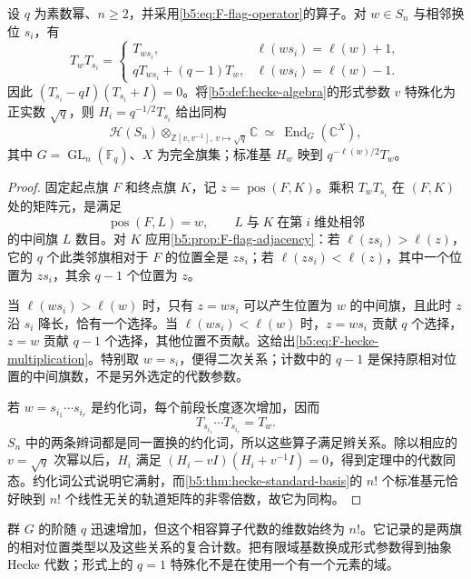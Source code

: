 \begin{theorem}\label{b5:thm:F-flag-hecke}
	设 \(q\) 为素数幂、\(n\ge2\)，并采用\eqref{b5:eq:F-flag-operator}的算子。对 \(w\in S_n\) 与相邻换位 \(s_i\)，有
	\begin{equation}\label{b5:eq:F-hecke-multiplication}
		T_wT_{s_i}=
		\begin{cases}
			T_{ws_i},&\ell(ws_i)=\ell(w)+1,\\
			qT_{ws_i}+(q-1)T_w,&\ell(ws_i)=\ell(w)-1.
		\end{cases}
	\end{equation}
	因此 \((T_{s_i}-qI)(T_{s_i}+I)=0\)。将\cref{b5:def:hecke-algebra}的形式参数 \(v\) 特殊化为正实数 \(\sqrt q\)，则 \(H_i=q^{-1/2}T_{s_i}\) 给出同构
	\[
		\mathcal H(S_n)\otimes_{\mathbb Z[v,v^{-1}],\,v\mapsto\sqrt q}\mathbb C
		\ \simeq\ \operatorname{End}_G(\mathbb C^X),
	\]
	其中 \(G=\operatorname{GL}_n(\mathbb F_q)\)、\(X\) 为完全旗集；标准基 \(H_w\) 映到 \(q^{-\ell(w)/2}T_w\)。
\end{theorem}
\begin{proof}
	固定起点旗 \(F\) 和终点旗 \(K\)，记 \(z=\operatorname{pos}(F,K)\)。乘积 \(T_wT_{s_i}\) 在 \((F,K)\) 处的矩阵元，是满足
	\[
		\operatorname{pos}(F,L)=w,\qquad L\;\text{与}\;K\;\text{在第}\;i\;\text{维处相邻}
	\]
	的中间旗 \(L\) 数目。对 \(K\) 应用\cref{b5:prop:F-flag-adjacency}：若 \(\ell(zs_i)>\ell(z)\)，它的 \(q\) 个此类邻旗相对于 \(F\) 的位置全是 \(zs_i\)；若 \(\ell(zs_i)<\ell(z)\)，其中一个位置为 \(zs_i\)，其余 \(q-1\) 个位置为 \(z\)。

	当 \(\ell(ws_i)>\ell(w)\) 时，只有 \(z=ws_i\) 可以产生位置为 \(w\) 的中间旗，且此时 \(z\) 沿 \(s_i\) 降长，恰有一个选择。当 \(\ell(ws_i)<\ell(w)\) 时，\(z=ws_i\) 贡献 \(q\) 个选择，\(z=w\) 贡献 \(q-1\) 个选择，其他位置不贡献。这给出\eqref{b5:eq:F-hecke-multiplication}。特别取 \(w=s_i\)，便得二次关系；计数中的 \(q-1\) 是保持原相对位置的中间旗数，不是另外选定的代数参数。

	若 \(w=s_{i_1}\cdots s_{i_r}\) 是约化词，每个前段长度逐次增加，因而
	\[
		T_{s_{i_1}}\cdots T_{s_{i_r}}=T_w.
	\]
	\(S_n\) 中的两条辫词都是同一置换的约化词，所以这些算子满足辫关系。除以相应的 \(v=\sqrt q\) 次幂以后，\(H_i\) 满足 \((H_i-vI)(H_i+v^{-1}I)=0\)，得到定理中的代数同态。约化词公式说明它满射，而\cref{b5:thm:hecke-standard-basis}的 \(n!\) 个标准基元恰好映到 \(n!\) 个线性无关的轨道矩阵的非零倍数，故它为同构。
\end{proof}

群 \(G\) 的阶随 \(q\) 迅速增加，但这个相容算子代数的维数始终为 \(n!\)。它记录的是两旗的相对位置类型以及这些关系的复合计数。把有限域基数换成形式参数得到抽象 Hecke 代数；形式上的 \(q=1\) 特殊化不是在使用一个有一个元素的域。

